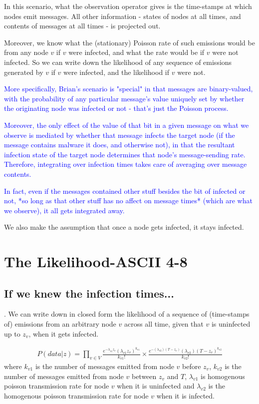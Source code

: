 \documentclass{article}
\begin{document}
	In this scenario, what the observation operator gives is the
	time-stamps at which nodes emit messages. All other information -
	states of nodes at all times, and contents of messages at all times -
	is projected out.

	Moreover, we know what the (stationary) Poisson rate of such emissions
	would be from any node $v$ if $v$ were infected, and what the rate would
	be if $v$ were not infected. So we can write down the likelihood of any
	sequence of emissions generated by $v$ if $v$ were infected, and the
	likelihood if $v$ were not.

        \textcolor{blue}{More specifically,  Brian's scenario is "special" in that messages are binary-valued, 
        with the probability of any particular message's value uniquely set by whether the originating 
        node was infected or not - that's just the Poisson process.}

        \textcolor{blue}{Moreover, the only effect of the value of that bit in a given message on what we observe is mediated by 
        whether that message infects the target node (if the message contains malware it does, and otherwise not), 
        in that the resultant infection state of the target node determines that node's message-sending rate. Therefore,  
        integrating over infection times takes care of averaging over message contents. } 

        \textcolor{blue}{In fact, even if the messages contained other stuff besides the bit of infected or not, *so long as that other 
        stuff has no affect on message times* (which are what we observe), it all gets integrated away.}

	We also make the assumption that once a node gets infected, it
	stays infected.

\section{The Likelihood-ASCII 4-8}
\subsection{If we knew the infection times...}	
    .
	We can write down in closed form the likelihood
        of a sequence of (time-stamps of) emissions from an arbitrary node $v$ 
        across all time, given that  $v$ is uninfected up to $z_{v}$, when it 
        gets infected. 
        
        \begin{align}
        P(data | z) = \prod_{v\in V}\frac{e^{-\lambda_{v1}z_v}(\lambda_{v1}z_v)^{k_{v1}}}{k_{v1}!}\times 
        \frac{e^{-(\lambda_{v2})(T-z_v)}(\lambda_{v2})(T-z_v)^{k_{v2}}}{k_{v2}!}
        \label{nothidden}
        \end{align}
        where $k_{v1}$ is the number of messages emitted from node $v$ before 
        $z_v$, $k_{v2}$ is the number of messages emitted from node $v$ between 
        $z_v$ and $T$, $\lambda_{v1}$ is  homogenous poisson transmission rate for
        node $v$ when it is uninfected and $\lambda_{v2}$ is the  homogenous 
        poisson transmission rate for node $v$ when it is infected.  
 
\end{document}
